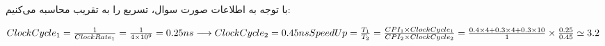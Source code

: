 با توجه به اطلاعات صورت سوال، تسریع را به تقریب محاسبه می‌کنیم:

\setLTR
$
ClockCycle_1 = \frac{1}{ClockRate_1} = \frac{1}{4\times10^9} = 0.25{ns} \longrightarrow ClockCycle_2 = 0.45ns \\  \\
SpeedUp = \frac{T_1}{T_2} = \frac{CPI_1 \times ClockCycle_1}{CPI_2 \times ClockCycle_2} = \frac{0.4\times4 + 0.3\times4+0.3\times10}{1} \times \frac{0.25}{0.45} \simeq 3.2
$
\setRTL